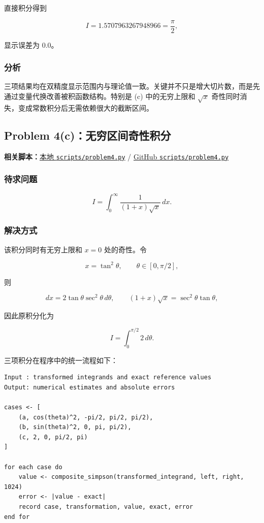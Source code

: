 \documentclass[12pt,a4paper,fontset=none]{ctexart}
\newcommand{\fileinline}[1]{{\urlstyle{same}\nolinkurl{#1}}}
\newcommand{\metadataline}[1]{#1}
\newcommand{\scriptpath}[1]{\fileinline{#1}}
\newcommand{\githubscriptsbase}{https://github.com/Void0312Aurora/computational-physics-homework-2026/blob/main/07/scripts}
\newcommand{\scriptlink}[1]{\noindent\metadataline{\textbf{相关脚本：}\href{../../../scripts/#1}{本地 \scriptpath{scripts/#1}} / \href{\githubscriptsbase/#1}{GitHub \scriptpath{scripts/#1}}}\par\medskip}
\begin{document}
直接积分得到

\[
I=1.5707963267948966=\frac{\pi}{2},
\]

显示误差为 \(0.0\)。

\subsubsection{分析}\label{ux5206ux6790-8}

三项结果均在双精度显示范围内与理论值一致。关键并不只是增大切片数，而是先通过变量代换改善被积函数结构。特别是 (c) 中的无穷上限和 \(\sqrt{x}\) 奇性同时消失，变成常数积分后无需依赖很大的截断区间。

\subsection{Problem 4(c)：无穷区间奇性积分}\label{problem-4c}

\scriptlink{problem4.py}

\subsubsection{待求问题}\label{ux5f85ux6c42ux95eeux9898-9}

\[
I=\int_0^\infty\frac{1}{(1+x)\sqrt{x}}\,dx.
\]

\subsubsection{解决方式}\label{ux89e3ux51b3ux65b9ux5f0f-9}

该积分同时有无穷上限和 \(x=0\) 处的奇性。令

\[
x=\tan^2\theta,\qquad \theta\in[0,\pi/2],
\]

则

\[
dx=2\tan\theta\sec^2\theta\,d\theta,
\qquad
(1+x)\sqrt{x}=\sec^2\theta\tan\theta,
\]

因此原积分化为

\[
I=\int_0^{\pi/2}2\,d\theta.
\]

三项积分在程序中的统一流程如下：

\begin{verbatim}
Input : transformed integrands and exact reference values
Output: numerical estimates and absolute errors

cases <- [
    (a, cos(theta)^2, -pi/2, pi/2, pi/2),
    (b, sin(theta)^2, 0, pi, pi/2),
    (c, 2, 0, pi/2, pi)
]

for each case do
    value <- composite_simpson(transformed_integrand, left, right, 1024)
    error <- |value - exact|
    record case, transformation, value, exact, error
end for
\end{verbatim}
\end{document}
